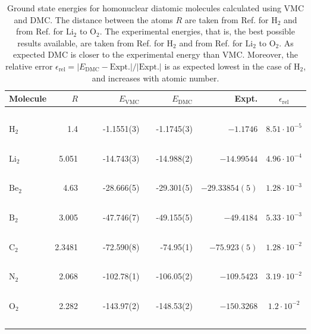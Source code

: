 \begin{table}
\begin{center}
\begin{tabular}{lrccrlrrc}
Molecule & $R$ & & \qquad & $E_\mathrm{VMC}$ & & \qquad $E_\mathrm{DMC}$ & \qquad\,\, Expt. & \qquad $\epsilon_\mathrm{rel}$\\
\hline\hline
\ \\
$\mathrm{H_2}$ & 1.4   & &\qquad & -1.1551(3)    & \qquad   & -1.1745(3)   & \qquad $-1.1746$      & \qquad $8.51\cdot 10^{-5}$ \\
\ \\
$\mathrm{Li_2}$& 5.051 & &\qquad & -14.743(3)    & \qquad   & -14.988(2)   & \qquad $-14.99544$    & \qquad $4.96\cdot 10^{-4}$ \\
\ \\
$\mathrm{Be_2}$& 4.63  & &\qquad & -28.666(5)    & \qquad   & -29.301(5)   & \qquad $-29.33854(5)$ & \qquad $1.28\cdot 10^{-3}$  \\
\ \\
$\mathrm{B_2}$ & 3.005 & &\qquad & -47.746(7)    & \qquad   & -49.155(5)   & \qquad $-49.4184$     & \qquad $5.33\cdot 10^{-3}$  \\
\ \\
$\mathrm{C_2}$ & 2.3481& &\qquad & -72.590(8)    & \qquad   & -74.95(1)    & \qquad $-75.923(5)$   & \qquad $1.28\cdot 10^{-2}$  \\
\ \\
$\mathrm{N_2}$ & 2.068 & &\qquad & -102.78(1)    & \qquad   & -106.05(2)   & \qquad $-109.5423$    & \qquad $3.19\cdot 10^{-2}$  \\
\ \\
$\mathrm{O_2}$ & 2.282 & &\qquad & -143.97(2)    & \qquad   & -148.53(2)   & \qquad $-150.3268$    & \qquad $1.2\cdot 10^{-2}$  \\
\ \\
\end{tabular}
\caption{Ground state energies for homonuclear diatomic molecules calculated using VMC and DMC. The distance between the atoms $R$ are taken from Ref. \cite{H_He_exact} for $\mathrm{H_2}$ and from Ref. \cite{UmrigarMolecules} for $\mathrm{Li_2}$ to $\mathrm{O_2}$. The experimental energies, that is, the best possible results available, are taken from Ref. \cite{H_He_exact} for $\mathrm{H_2}$ and from Ref. \cite{ExactMolecules} for $\mathrm{Li_2}$ to $\mathrm{O_2}$. As expected DMC is closer to the experimental energy than VMC. Moreover, the relative error $\epsilon_\mathrm{rel} = |E_\mathrm{DMC} - \mathrm{Expt.}|/|\mathrm{Expt.}|$ is as expected lowest in the case of $\mathrm{H_2}$, and increases with atomic number.}
\label{tab:MoleculesRes}
\end{center}
\end{table}

